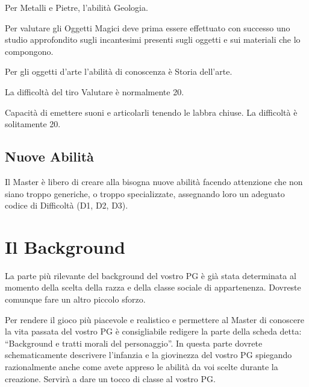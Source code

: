 Per Metalli e Pietre, l'abilit\`a Geologia.

Per valutare gli Oggetti Magici deve prima essere effettuato con
successo uno studio approfondito sugli incantesimi presenti sugli
oggetti e sui materiali che lo compongono. 

Per gli oggetti d'arte l'abilit\`a di conoscenza \`e Storia
dell'arte.

La difficolt\`a del tiro Valutare \`e normalmente 20.


 Capacit\`a di emettere suoni e articolarli
tenendo le labbra chiuse. La difficolt\`a \`e solitamente 20.

\subsection{Nuove Abilit\`a}

Il Master \`e libero di creare alla bisogna nuove abilit\`a facendo
attenzione che non siano troppo generiche, o troppo specializzate,
assegnando loro un adeguato codice di Difficolt\`a (D1, D2, D3).

\fi


\iffullversion
{}

\section{Il Background}
  
La parte pi\`u rilevante del background del vostro PG \`e gi\`a stata
determinata al momento della scelta della razza e della classe sociale
di appartenenza. Dovreste comunque fare un altro piccolo sforzo.

Per rendere il gioco pi\`u piacevole e realistico e
permettere al Master di conoscere la vita passata del vostro PG \`e
consigliabile redigere la parte della scheda detta: ``Background e
tratti morali del personaggio''.  In questa parte dovrete
schematicamente descrivere l'infanzia e la giovinezza del vostro PG
spiegando razionalmente anche come avete appreso le abilit\`a da voi
scelte durante la creazione.  Servir\`a a dare un tocco di classe al
vostro PG. 

